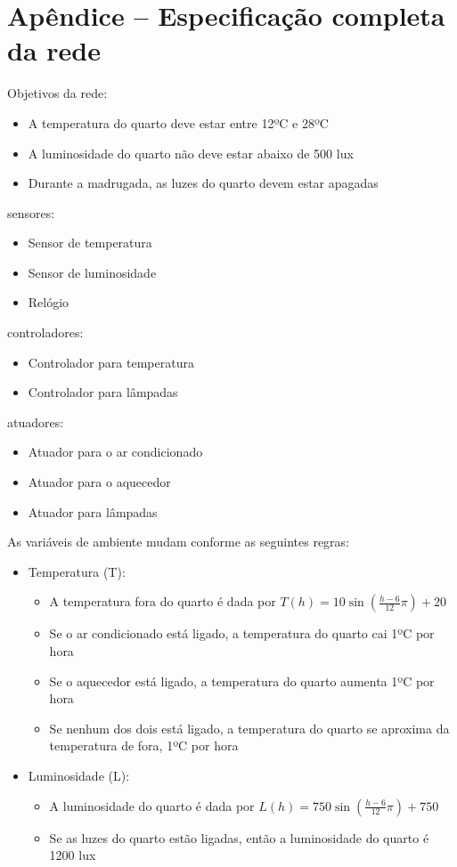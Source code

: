 \section{Apêndice -- Especificação completa da rede} \label{apx:apx1}

\noindent
Objetivos da rede:
\begin{itemize}
  \item A temperatura do quarto deve estar entre 12ºC e 28ºC
  \item A luminosidade do quarto não deve estar abaixo de 500 lux
  \item Durante a madrugada, as luzes do quarto devem estar apagadas
\end{itemize}

 sensores:
\begin{itemize}
  \item Sensor de temperatura
  \item Sensor de luminosidade
  \item Relógio
\end{itemize}

 controladores:
\begin{itemize}
  \item Controlador para temperatura
  \item Controlador para lâmpadas
\end{itemize}

 atuadores:
\begin{itemize}
  \item Atuador para o ar condicionado
  \item Atuador para o aquecedor
  \item Atuador para lâmpadas
\end{itemize}

\noindent
As variáveis de ambiente mudam conforme as seguintes regras:
\begin{itemize}
  \item Temperatura (T):
  \begin{itemize}
    \item A temperatura fora do quarto é dada por $T(h) = 10 \sin(\frac{h - 6}{12} \pi) + 20$
    \item Se o ar condicionado está ligado, a temperatura do quarto cai 1ºC por hora
    \item Se o aquecedor está ligado, a temperatura do quarto aumenta 1ºC por hora
    \item Se nenhum dos dois está ligado, a temperatura do quarto se aproxima da temperatura de fora, 1ºC por hora
  \end{itemize}
  \item Luminosidade (L):
  \begin{itemize}
    \item A luminosidade do quarto é dada por $L(h) = 750 \sin(\frac{h - 6}{12} \pi) + 750$
    \item Se as luzes do quarto estão ligadas, então a luminosidade do quarto é 1200 lux
  \end{itemize}
\end{itemize}

